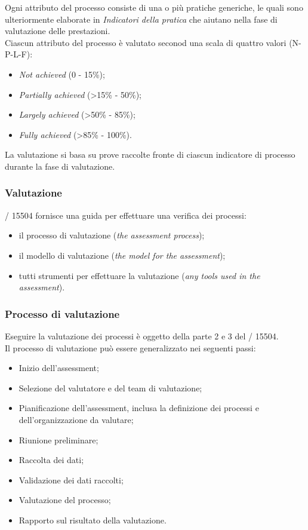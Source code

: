   Ogni attributo del processo consiste di una o più pratiche generiche, le quali sono ulteriormente elaborate in \emph{Indicatori della pratica} che aiutano nella fase di valutazione delle prestazioni.
  \\Ciascun attributo del processo è valutato seconod una scala di quattro valori (N-P-L-F):
  \begin{itemize}
    \item \emph{Not achieved} (0 - 15\%);
    \item \emph{Partially achieved} (>15\% - 50\%);
    \item \emph{Largely achieved} (>50\% - 85\%);
    \item \emph{Fully achieved} (>85\% - 100\%).
  \end{itemize}
  La valutazione si basa su prove raccolte fronte di ciascun indicatore di processo durante la fase di valutazione.\\

  \subsubsection{Valutazione}
  / 15504 fornisce una guida per effettuare una verifica dei processi:
  \begin{itemize}
    \item il processo di valutazione (\emph{the assessment process});
    \item il modello di valutazione (\emph{the model for the assessment});
    \item tutti strumenti per effettuare la valutazione (\emph{any tools used in the assessment}).
  \end{itemize}
  \subsubsection{Processo di valutazione}
  Eseguire la valutazione dei processi è oggetto della parte 2 e 3 del / 15504.\\
  Il processo di valutazione può essere generalizzato nei seguenti passi:
  \begin{itemize}
    \item Inizio dell'assessment;
    \item Selezione del valutatore e del team di valutazione;
    \item Pianificazione dell'assessment, inclusa la definizione dei processi e dell'organizzazione da valutare;
    \item Riunione preliminare;
    \item Raccolta dei dati;
    \item Validazione dei dati raccolti;
    \item Valutazione del processo;
    \item Rapporto sul risultato della valutazione.
  \end{itemize}

